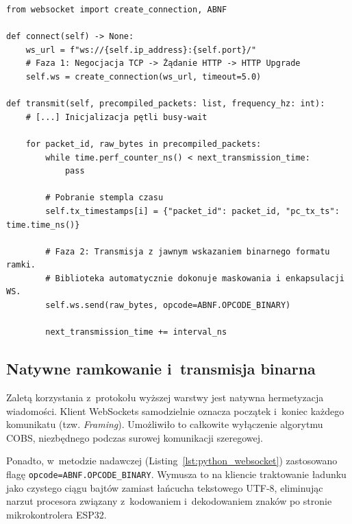\begin{listing}[htbp]
    \caption{Synchroniczna implementacja klienta WebSockets z~użyciem binarnych kodów operacji (\texttt{ws\_dp.py}) \cite{espy_nexus_python_host}.}
    \label{lst:python_websocket}
    \begin{verbatim}
from websocket import create_connection, ABNF

def connect(self) -> None:
    ws_url = f"ws://{self.ip_address}:{self.port}/"
    # Faza 1: Negocjacja TCP -> Żądanie HTTP -> HTTP Upgrade
    self.ws = create_connection(ws_url, timeout=5.0)

def transmit(self, precompiled_packets: list, frequency_hz: int):
    # [...] Inicjalizacja pętli busy-wait

    for packet_id, raw_bytes in precompiled_packets:
        while time.perf_counter_ns() < next_transmission_time:
            pass

        # Pobranie stempla czasu
        self.tx_timestamps[i] = {"packet_id": packet_id, "pc_tx_ts": time.time_ns()}

        # Faza 2: Transmisja z jawnym wskazaniem binarnego formatu ramki.
        # Biblioteka automatycznie dokonuje maskowania i enkapsulacji WS.
        self.ws.send(raw_bytes, opcode=ABNF.OPCODE_BINARY)

        next_transmission_time += interval_ns
\end{verbatim}
\end{listing}

\subsection{Natywne ramkowanie i~transmisja binarna}
Zaletą korzystania z~protokołu wyższej warstwy jest natywna hermetyzacja wiadomości.
Klient WebSockets samodzielnie oznacza początek i~koniec każdego komunikatu (tzw. \textit{Framing}).
Umożliwiło to całkowite wyłączenie algorytmu COBS, niezbędnego podczas surowej komunikacji szeregowej.

Ponadto, w~metodzie nadawczej (Listing~\ref{lst:python_websocket}) zastosowano flagę \texttt{opcode=ABNF.OPCODE\_BINARY}.
Wymusza to na kliencie traktowanie ładunku jako czystego ciągu bajtów zamiast łańcucha tekstowego UTF-8, eliminując narzut procesora związany z~kodowaniem i~dekodowaniem znaków po stronie mikrokontrolera ESP32.
